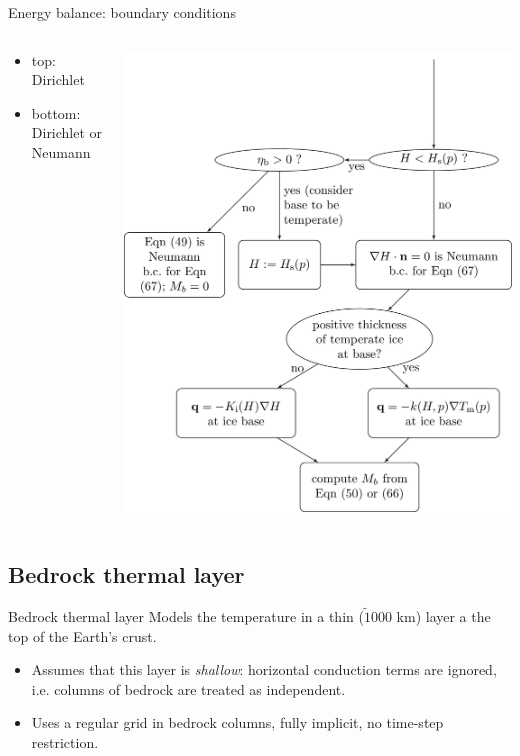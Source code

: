 \documentclass[hide notes,intlimits]{beamer}
\begin{document}
\begin{frame}{Energy balance: boundary conditions}

  \begin{columns}[c]
    \begin{column}{0.5\linewidth}
      \begin{itemize}
      \item top: Dirichlet
      \item bottom: Dirichlet or Neumann
      \end{itemize}
    \end{column}

    \begin{column}{0.5\linewidth}
      \includegraphics[width=0.9\linewidth]{enthalpy-basal-bc}
    \end{column}
  \end{columns}
\end{frame}

\subsection{Bedrock thermal layer}
\label{sec:bedrock}

\begin{frame}{Bedrock thermal layer}
  Models the temperature in a thin ($\tilde 1000$ km) layer a the top
  of the Earth's crust.

  \begin{itemize}
  \item Assumes that this layer is \emph{shallow}: horizontal
    conduction terms are ignored, i.e. columns of bedrock are treated
    as independent.
  \item Uses a regular grid in bedrock columns, fully implicit, no
    time-step restriction.
  \end{itemize}
\end{frame}
\end{document}
